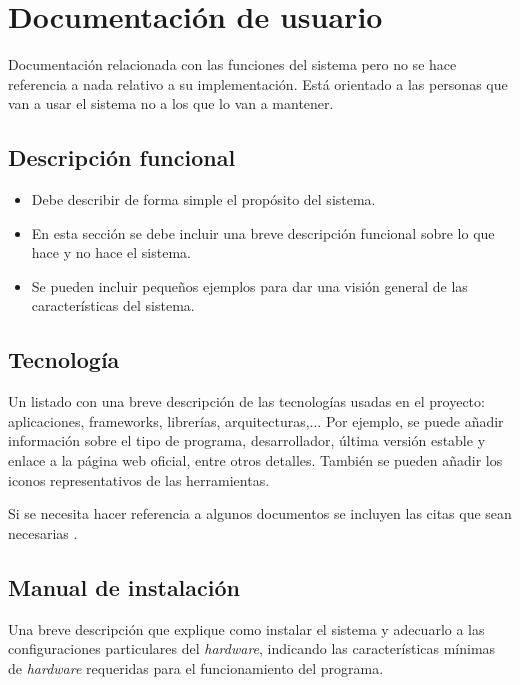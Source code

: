 

\section{Documentación de usuario}

Documentación relacionada con las funciones del sistema pero no se hace referencia a nada relativo a su implementación. Está orientado a las personas que van a usar el sistema no a los que lo van a mantener.  


\subsection{Descripción funcional}

\begin{itemize}
  \item Debe describir de forma simple el propósito del sistema.
  \item En esta sección se debe incluir una breve descripción funcional sobre lo que hace y no hace el sistema.
  \item Se pueden incluir pequeños ejemplos para dar una visión general de las características del sistema.  
\end{itemize}


\subsection{Tecnología}

Un listado con una breve descripción de las tecnologías usadas en el proyecto: aplicaciones, frameworks, librerías, arquitecturas,...
Por ejemplo, se puede añadir información sobre el tipo de programa, desarrollador, última versión estable y enlace a la página web oficial, entre otros detalles. 
También se pueden añadir los iconos representativos de las herramientas.

\bigskip

Si se necesita hacer referencia a algunos documentos se incluyen las citas que sean necesarias \citep{Ejemplo1, Ejemplo2}.


\subsection{Manual de instalación}

Una breve descripción que explique como instalar el sistema y adecuarlo a las configuraciones particulares del \textit{hardware}, indicando las características mínimas de \textit{hardware} requeridas para el funcionamiento del programa.  


